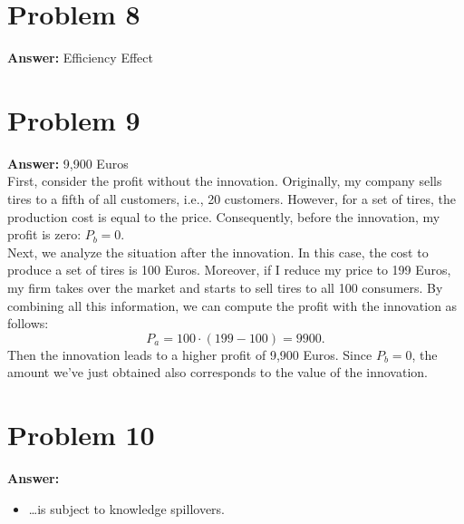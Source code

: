 \documentclass[11pt]{article}
\begin{document}
\section*{Problem 8}
\label{sec:org7fd4aa6}

\textbf{Answer:} Efficiency Effect
\section*{Problem 9}
\label{sec:orgd4bd27c}

\textbf{Answer:} 9,900 Euros\\

First, consider the profit without the innovation. Originally, my company
sells tires to a fifth of all customers, i.e., 20 customers. However, for a
set of tires, the production cost is equal to the price. Consequently,
before the innovation, my profit is zero: \(P_b=0\).\\
Next, we analyze the situation after the innovation. In this case, the cost
to produce a set of tires is 100 Euros. Moreover, if I reduce my price to
199 Euros, my firm takes over the market and starts to sell tires to all
100 consumers. By combining all this information, we can compute the profit
with the innovation as follows:
\begin{equation*}
P_a=100\cdot(199-100)=9900.
\end{equation*}
Then the innovation leads to a higher profit of 9,900 Euros. Since
\(P_b=0\), the amount we've just obtained also corresponds to the value
of the innovation.
\section*{Problem 10}
\label{sec:org621f37a}

\textbf{Answer:}
\begin{itemize}
\item \ldots{}is subject to knowledge spillovers.
\end{itemize}
\end{document}
